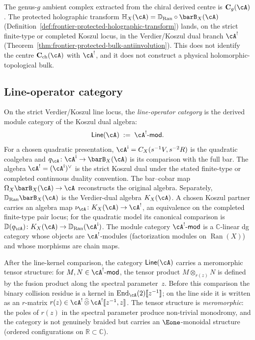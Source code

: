 The genus-$g$ ambient complex extracted from the chiral derived centre
is $\mathbf{C}_g(\cA)$. The protected holographic transform
$\mathbb{H}_X(\cA) = \mathbb{D}_{\operatorname{Ran}}
\circ \barB_X(\cA)$
(Definition~\ref{def:frontier-protected-holographic-transform})
lands, on the strict finite-type or completed Koszul locus, in the
Verdier/Koszul dual branch $\cA^!$
(Theorem~\ref{thm:frontier-protected-bulk-antiinvolution}). This
does not identify the centre $\mathbf{C}_{\mathrm{ch}}(\cA)$ with
$\cA^!$, and it does not construct a physical holomorphic-topological
bulk.

\subsection{Line-operator category}
\label{subsec:vertex-lines}

On the strict Verdier/Koszul line locus, the \emph{line-operator
category} is the derived module category of the Koszul dual algebra:
\begin{equation}\label{eq:supp-line-category-def}
\mathsf{Line}(\cA) \;:=\; \cA^!\text{-}\mathsf{mod}.
\end{equation}
For a chosen quadratic presentation,
$\cA^{\mathrm i}=C_X(s^{-1}V,s^{-2}R)$ is the quadratic coalgebra and
$q_\cA\colon\cA^{\mathrm i}\to\barB_X(\cA)$ is its comparison with
the full bar.  The algebra
$\cA^! = (\cA^{\mathrm i})^\vee$ is the strict Koszul dual
under the stated finite-type or completed continuous duality
convention. The bar--cobar map
$\Omega_X\barB_X(\cA)\to\cA$ reconstructs the original algebra.
Separately,
$\mathbb{D}_{\operatorname{Ran}}\barB_X(\cA)$ is the Verdier-dual
algebra $K_X(\cA)$.  A chosen Koszul partner carries an algebra map
$\nu_{\cA}\colon K_X(\cA)\to\cA^!$, an equivalence on the completed
finite-type pair locus; for the quadratic model its canonical
comparison is
$\mathbb D(q_\cA)\colon K_X(\cA)\to
\mathbb D_{\operatorname{Ran}}(\cA^{\mathrm i})$. The module category
$\cA^!\text{-}\mathsf{mod}$ is a
$\mathbb{C}$-linear dg category whose objects are $\cA^!$-modules
(factorization modules on $\operatorname{Ran}(X)$) and whose morphisms
are chain maps.

After the line-kernel comparison, the category $\mathsf{Line}(\cA)$
carries a meromorphic tensor structure: for
$M, N \in \cA^!\text{-}\mathsf{mod}$, the tensor product
$M \otimes_{r(z)} N$ is defined by the fusion product along the
spectral parameter~$z$. Before this comparison the binary collision
residue is a kernel in $\mathrm{End}_{\cA}(2)[\![z^{-1}]\!]$; on the
line side it is written as an $r$-matrix
$r(z) \in \cA^! \,\widehat{\otimes}\, \cA^![\![z^{-1}, z]\!]$.
The tensor structure is \emph{meromorphic}: the poles of $r(z)$ in
the spectral parameter produce non-trivial monodromy, and the
category is not genuinely braided but carries an $\Eone$-monoidal
structure (ordered configurations on $\mathbb{R} \subset \mathbb{C}$).

